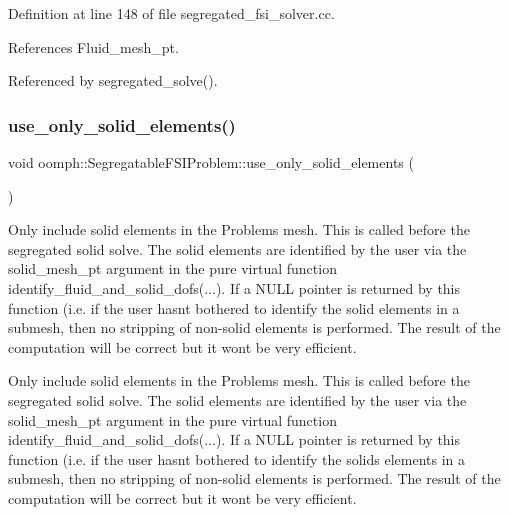 Definition at line 148 of file segregated\+\_\+fsi\+\_\+solver.\+cc.



References Fluid\+\_\+mesh\+\_\+pt.



Referenced by segregated\+\_\+solve().

\mbox{\label{classoomph_1_1SegregatableFSIProblem_a330660bc7b69c9c128bfed62b54dcf62}} 
\subsubsection{\texorpdfstring{use\+\_\+only\+\_\+solid\+\_\+elements()}{use\_only\_solid\_elements()}}
{\footnotesize\ttfamily void oomph\+::\+Segregatable\+F\+S\+I\+Problem\+::use\+\_\+only\+\_\+solid\+\_\+elements (\begin{DoxyParamCaption}{ }\end{DoxyParamCaption})\hspace{0.3cm}{\ttfamily [private]}}



Only include solid elements in the Problem\textquotesingle{}s mesh. This is called before the segregated solid solve. The solid elements are identified by the user via the solid\+\_\+mesh\+\_\+pt argument in the pure virtual function identify\+\_\+fluid\+\_\+and\+\_\+solid\+\_\+dofs(...). If a N\+U\+LL pointer is returned by this function (i.\+e. if the user hasn\textquotesingle{}t bothered to identify the solid elements in a submesh, then no stripping of non-\/solid elements is performed. The result of the computation will be correct but it won\textquotesingle{}t be very efficient. 

Only include solid elements in the Problem\textquotesingle{}s mesh. This is called before the segregated solid solve. The solid elements are identified by the user via the solid\+\_\+mesh\+\_\+pt argument in the pure virtual function identify\+\_\+fluid\+\_\+and\+\_\+solid\+\_\+dofs(...). If a N\+U\+LL pointer is returned by this function (i.\+e. if the user hasn\textquotesingle{}t bothered to identify the solids elements in a submesh, then no stripping of non-\/solid elements is performed. The result of the computation will be correct but it won\textquotesingle{}t be very efficient. 

